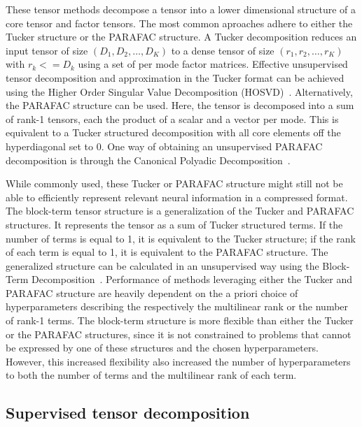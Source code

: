 These tensor methods decompose a tensor into a lower dimensional structure of a
core tensor and factor tensors.
The most common aproaches adhere to either the Tucker structure or the PARAFAC
structure.
A Tucker decomposition reduces an input tensor of size $(D_1,D_2,\ldots,D_K)$ to
a dense  tensor of size $(r_1,r_2,\ldots,r_K)$ with $r_k<=D_k$ using a
set of per mode factor matrices.
Effective unsupervised tensor decomposition and approximation in the Tucker format can be achieved
using the Higher Order Singular Value
Decomposition (HOSVD)~\cite{DeLathauwer2000,SoleCasals2018}.
Alternatively, the PARAFAC structure can be used.
Here, the tensor is decomposed into a sum of rank-1 tensors, each the product
of a scalar and a vector per mode.
This is equivalent to a Tucker structured decomposition with all core elements
off the hyperdiagonal set to 0.
One way of obtaining an unsupervised PARAFAC decomposition is through the Canonical Polyadic
Decomposition~\cite{Hitchcock1927,Nazarpour2006}.

While commonly used, these Tucker or PARAFAC structure might still not be able to
efficiently represent relevant neural information in a compressed format.
The block-term tensor structure is a generalization of the Tucker and
PARAFAC structures.
It represents the tensor as a sum of Tucker structured terms.
If the number of terms is equal to 1, it is equivalent to the Tucker structure;
if the rank of each term is equal to 1, it is equivalent to the PARAFAC
structure.
The generalized structure can be calculated in an unsupervised way using
the Block-Term Decomposition~\cite{DeLathauwer2008,DeLathauwer2008a,DeLathauwer2008b,Rontogiannis2021}.
Performance of methods leveraging either the Tucker and PARAFAC structure are
heavily dependent on the a priori choice of hyperparameters describing the
respectively the multilinear rank or the number of rank-1 terms.
The block-term structure is more flexible than either the Tucker or the PARAFAC
structures, since it is not constrained to problems that cannot be expressed by
one of these structures and the chosen hyperparameters.
However, this increased flexibility also increased the number of
hyperparameters to both the number of terms and the multilinear rank of each term.

\subsection{Supervised tensor decomposition}

